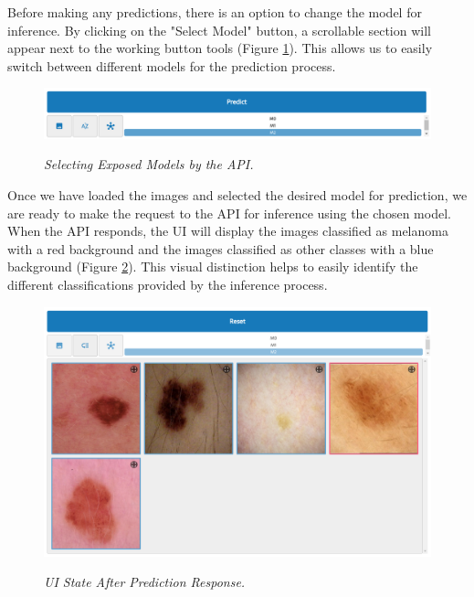 Before making any predictions, there is an option to change
the model for inference. By clicking on the "Select Model" button, a scrollable
section will appear next to the working button tools (Figure
\ref{fig:selecting-model}). This allows us to easily switch between different
models for the prediction process.

\begin{figure}[H]
  \centering
  \includegraphics[width=\textwidth]{imatges/results/selecting-model.png}
  \caption[Selecting Exposed Models by the API]{\textit{Selecting Exposed Models by the API. }}
  {\label{fig:selecting-model}}
\end{figure}

Once we have loaded the images and selected the desired model for prediction,
we are ready to make the request to the API for inference using the chosen model. When the API responds,
the UI will display the images classified as melanoma with a
red background and the images classified as other classes with a blue background (Figure \ref{fig:after-prediction}).
This visual distinction helps to easily identify the different classifications provided by the inference process.

\begin{figure}[H]
  \centering
  \begin{adjustbox}{width=\textwidth, trim={0cm 3.55cm 0cm 0cm}, clip}
    \includegraphics[width=\textwidth]{imatges/results/after-prediction.png}
  \end{adjustbox}
  \caption[UI State After Prediction Response]{\textit{UI State After Prediction Response. }}
  {\label{fig:after-prediction}}
\end{figure}

